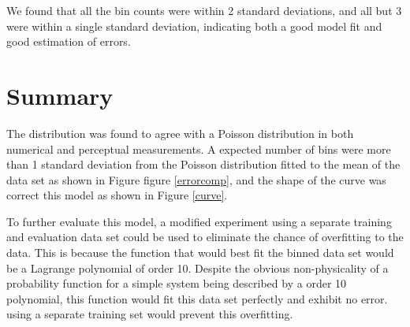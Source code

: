 \documentclass[10pt]{iopart}
\begin{document}
 We found that all the bin counts were within 2 standard deviations, and all but 3 were within a single standard deviation, indicating both a good model fit and good estimation of errors.
    
\section{Summary}

The distribution was found to agree with a Poisson distribution in both numerical and perceptual measurements. A expected number of bins were more than 1 standard deviation from the Poisson distribution fitted to the mean of the data set as shown in Figure figure \ref{errorcomp}, and the shape of the curve was correct this model as shown in Figure \ref{curve}. 

To further evaluate this model, a modified experiment using a separate training and evaluation data set could be used to eliminate the chance of overfitting to the data. This is because the function that would best fit the binned data set would be a Lagrange polynomial of order 10. Despite the obvious non-physicality of a probability function for a simple system being described by a order 10 polynomial, this function would fit this data set perfectly and exhibit no error. using a separate training set would prevent this overfitting.

\clearpage
\printbibliography
\end{document}

